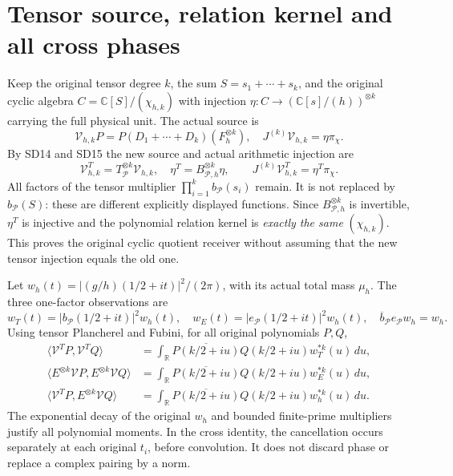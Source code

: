 \documentclass[11pt]{article}
\newcommand{\C}{\mathbb C}
\begin{document}
\section{Tensor source, relation kernel and all cross phases}
Keep the original tensor degree $k$, the sum $S=s_1+\cdots+s_k$,
and the original cyclic algebra $C=\C[S]/(\chi_{h,k})$ with
injection $\eta:C\to(\C[s]/(h))^{\otimes k}$ carrying the full
physical unit. The actual source is
\[
 \mathcal V_{h,k}P=P(D_1+\cdots+D_k)(F_h^{\otimes k}),\quad
 J^{(k)}\mathcal V_{h,k}=\eta\pi_\chi.
                                                               \tag{SD18}
\]
By SD14 and SD15 the new source and actual arithmetic injection are
\[
 \mathcal V^T_{h,k}=T_{\mathcal P}^{\otimes k}\mathcal V_{h,k},
 \quad\eta^T=B_{\mathcal P,h}^{\otimes k}\eta,
 \qquad J^{(k)}\mathcal V^T_{h,k}=\eta^T\pi_\chi.              \tag{SD19}
\]
All factors of the tensor multiplier
$\prod_{i=1}^kb_{\mathcal P}(s_i)$ remain. It is not replaced by
$b_{\mathcal P}(S)$: these are different explicitly displayed
functions. Since $B_{\mathcal P,h}^{\otimes k}$ is invertible,
$\eta^T$ is injective and the polynomial relation kernel is
\emph{exactly the same} $(\chi_{h,k})$. This proves the original
cyclic quotient receiver without assuming that the new tensor
injection equals the old one.

Let $w_h(t)=|(g/h)(1/2+it)|^2/(2\pi)$, with its actual total mass
$\mu_h$. The three one-factor observations are
\[
 w_T(t)=|b_{\mathcal P}(1/2+it)|^2w_h(t),\quad
 w_E(t)=|e_{\mathcal P}(1/2+it)|^2w_h(t),\quad
 \overline b_{\mathcal P}e_{\mathcal P}w_h=w_h.                \tag{SD20}
\]
Using tensor Plancherel and Fubini, for all original polynomials $P,Q$,
\begin{align*}
\langle\mathcal V^T P,\mathcal V^T Q\rangle
 &=\int_\mathbb R\overline{P(k/2+iu)}Q(k/2+iu)
                      w_T^{*k}(u)\,du,\\
\langle E^{\otimes k}\mathcal V P,E^{\otimes k}\mathcal V Q\rangle
 &=\int_\mathbb R\overline{P(k/2+iu)}Q(k/2+iu)
                      w_E^{*k}(u)\,du,\\
\boxed{\langle\mathcal V^T P,E^{\otimes k}\mathcal V Q\rangle}
 &=\boxed{\int_\mathbb R\overline{P(k/2+iu)}Q(k/2+iu)
                       w_h^{*k}(u)\,du.}                    \tag{SD21}
\end{align*}
The exponential decay of the original $w_h$ and bounded finite-prime
multipliers justify all polynomial moments. In the cross identity,
the cancellation occurs separately at each original $t_i$, before
convolution. It does not discard phase or replace a complex pairing
by a norm.
\end{document}
